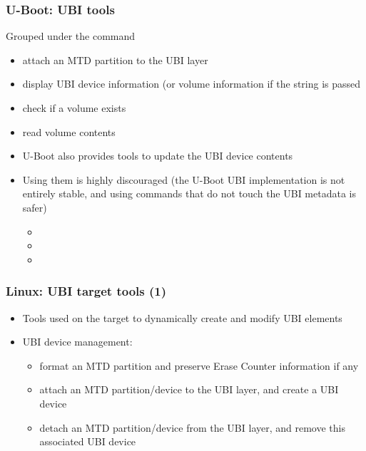 \begin{frame}
  \frametitle{U-Boot: UBI tools}
  Grouped under the  command
    \begin{itemize}
    \item {} attach an MTD partition to the UBI
      layer
    \item {} display UBI device information (or
      volume information if the  string is passed
    \item {} check if a volume exists
    \item {} read volume
      contents
    \item U-Boot also provides tools to update the UBI device contents
    \item Using them is highly discouraged (the U-Boot UBI implementation
      is not entirely stable, and using commands that do not touch the UBI
      metadata is safer)
      \begin{itemize}
      \item {}
      \item {}
      \item {}
      \end{itemize}
    \end{itemize}
\end{frame}

\begin{frame}
  \frametitle{Linux: UBI target tools (1)}
  \begin{itemize}
  \item Tools used on the target to dynamically create and modify
      UBI elements
  \item UBI device management:
    \begin{itemize}
    \item {} format an MTD partition and
      preserve Erase Counter information if any
    \item {} attach an
      MTD partition/device to the UBI layer, and create a UBI device
    \item {} detach an
      MTD partition/device from the UBI layer, and remove this associated
      UBI device
    \end{itemize}
  \end{itemize}
\end{frame}

